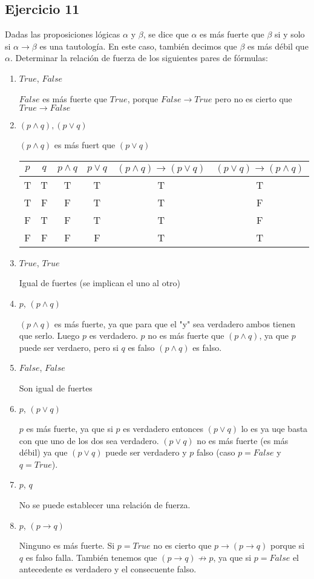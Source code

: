 \documentclass[10pt,a4paper]{article}
\begin{document}
\subsection*{Ejercicio 11}
Dadas las proposiciones lógicas $\alpha$ y $\beta$, se dice que $\alpha$ es más fuerte que $\beta$ si y solo si $\alpha \rightarrow \beta$ es una tautología. En este caso, también decimos que $\beta$ es más débil que $\alpha$. Determinar la relación de fuerza de los siguientes pares de fórmulas:
\begin{enumerate}
\item $True$, $False$

$False$ es más fuerte que $True$, porque $False \rightarrow True$ pero no es cierto que $True\rightarrow False$

\item $(p \wedge q), (p \vee q)$

$(p \wedge q)$ es más fuert que $(p \vee q)$

\begin{tabular}{|c|c|c|c|c|c|}
\hline
$p$ & $q$ & $p \wedge q$ & $p \vee q$ & $(p \wedge q)\rightarrow (p \vee q)$ & $(p \vee q)\rightarrow (p \wedge q)$ \\ \hline
T & T & T & T & T & T\\
T & F & F & T & T & F\\
F & T & F & T & T & F\\
F & F & F & F & T & T\\ \hline
\end{tabular}

\item $True$, $True$

Igual de fuertes (se implican el uno al otro)

\item $p$, $(p \wedge q)$

$(p \wedge q)$ es más fuerte, ya que para que el "y" sea verdadero ambos tienen que serlo. Luego $p$ es verdadero. $p$ no es más fuerte que $(p \wedge q)$, ya que $p$ puede ser verdaero, pero si $q$ es falso $(p \wedge q)$ es falso.

\item $False$, $False$

Son igual de fuertes

\item $p$, $(p \vee q)$

$p$ es más fuerte, ya que si $p$ es verdadero entonces $(p \vee q)$ lo es ya uqe basta con que uno de los dos sea verdadero. $(p \vee q)$ no es más fuerte (es más débil) ya que $(p \vee q)$ puede ser verdadero y $p$ falso (caso $p=False$ y $q=True$).

\item $p$, $q$

No se puede establecer una relación de fuerza. 

\item  $p$, $(p \rightarrow q)$

Ninguno es más fuerte. Si $p=True$ no es cierto que $p \rightarrow (p \rightarrow q)$ porque si $q$ es falso falla. También tenemos que $(p \rightarrow q)\not \rightarrow p$, ya que si $p=False$ el antecedente es verdadero y el consecuente falso.
\end{enumerate}
\end{document}
